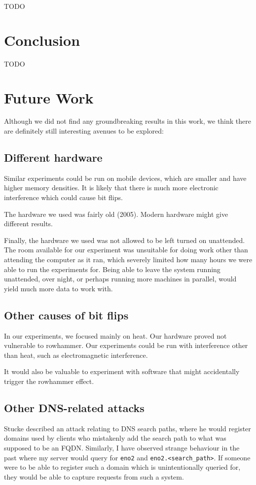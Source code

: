 \documentclass[conference]{IEEEtran}
\begin{document}
TODO


\section{Conclusion}\label{sec:conc}

TODO


\section{Future Work}\label{sec:futwork}

Although we did not find any groundbreaking results in this work, we think
there are definitely still interesting avenues to be explored:

\subsection{Different hardware}

Similar experiments could be run on mobile devices, which are smaller and have
higher memory densities. It is likely that there is much more electronic
interference which could cause bit flips.

The hardware we used was fairly old (2005). Modern hardware might give
different results.

Finally, the hardware we used was not allowed to be left turned on unattended.
The room available for our experiment was unsuitable for doing work other than
attending the computer as it ran, which severely limited how many hours we were
able to run the experiments for. Being able to leave the system running
unattended, over night, or perhaps running more machines in parallel, would
yield much more data to work with.


\subsection{Other causes of bit flips}

In our experiments, we focused mainly on heat. Our hardware proved not
vulnerable to rowhammer. Our experiments could be run with interference other
than heat, such as electromagnetic interference.

It would also be valuable to experiment with software that might accidentally
trigger the rowhammer effect.

\subsection{Other DNS-related attacks}

Stucke\cite{suffixpath} described an attack relating to DNS search paths, where
he would register domains used by clients who mistakenly add the search path to
what was supposed to be an FQDN. Similarly, I have observed strange behaviour
in the past where my server would query for \texttt{eno2} and
\texttt{eno2.<search\_path>}. If someone were to be able to register such a
domain which is unintentionally queried for, they would be able to capture
requests from such a system.


\printbibliography


\end{document}
